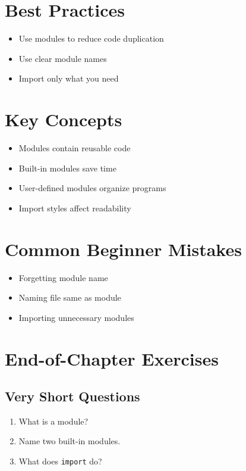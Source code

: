 \section{Best Practices}

\begin{itemize}
    \item Use modules to reduce code duplication
    \item Use clear module names
    \item Import only what you need
\end{itemize}

\section{Key Concepts}

\begin{itemize}
    \item Modules contain reusable code
    \item Built-in modules save time
    \item User-defined modules organize programs
    \item Import styles affect readability
\end{itemize}

\section{Common Beginner Mistakes}

\begin{itemize}
    \item Forgetting module name
    \item Naming file same as module
    \item Importing unnecessary modules
\end{itemize}

\section{End-of-Chapter Exercises}

\subsection{Very Short Questions}

\begin{enumerate}
    \item What is a module?
    \item Name two built-in modules.
    \item What does \texttt{import} do?
\end{enumerate}

